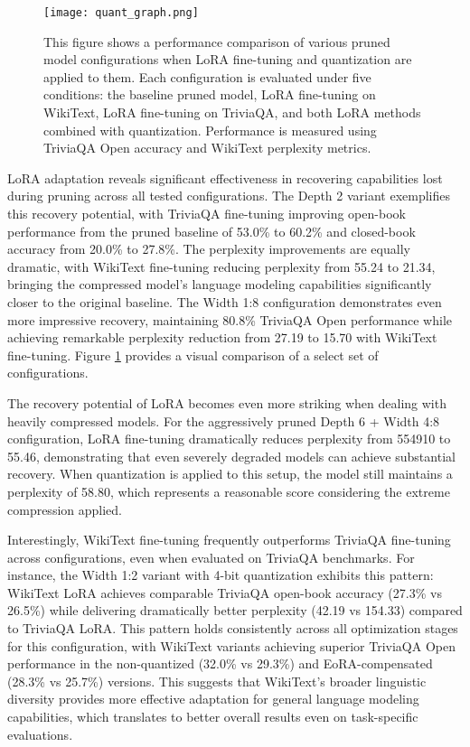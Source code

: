 \begin{figure}[!htbp]
    \centering
    \texttt{[image: quant\_graph.png]}
    \caption[Comparison of Quantized and LoRA Models]{This figure shows a performance comparison of various pruned model configurations when LoRA fine-tuning and quantization are applied to them. Each configuration is evaluated under five conditions: the baseline pruned model, LoRA fine-tuning on WikiText, LoRA fine-tuning on TriviaQA, and both LoRA methods combined with quantization. Performance is measured using TriviaQA Open accuracy and WikiText perplexity metrics.}
    \label{fig:graph_quant}
\end{figure}

LoRA adaptation reveals significant effectiveness in recovering capabilities lost during pruning across all tested configurations. The Depth 2 variant exemplifies this recovery potential, with TriviaQA fine-tuning improving open-book performance from the pruned baseline of 53.0\% to 60.2\% and closed-book accuracy from 20.0\% to 27.8\%. The perplexity improvements are equally dramatic, with WikiText fine-tuning reducing perplexity from 55.24 to 21.34, bringing the compressed model's language modeling capabilities significantly closer to the original baseline. The Width 1:8 configuration demonstrates even more impressive recovery, maintaining 80.8\% TriviaQA Open performance while achieving remarkable perplexity reduction from 27.19 to 15.70 with WikiText fine-tuning. Figure \ref{fig:graph_quant} provides a visual comparison of a select set of configurations.

The recovery potential of LoRA becomes even more striking when dealing with heavily compressed models. For the aggressively pruned Depth 6 + Width 4:8 configuration, LoRA fine-tuning dramatically reduces perplexity from 554910 to 55.46, demonstrating that even severely degraded models can achieve substantial recovery. When quantization is applied to this setup, the model still maintains a perplexity of 58.80, which represents a reasonable score considering the extreme compression applied.

Interestingly, WikiText fine-tuning frequently outperforms TriviaQA fine-tuning across configurations, even when evaluated on TriviaQA benchmarks. For instance, the Width 1:2 variant with 4-bit quantization exhibits this pattern: WikiText LoRA achieves comparable TriviaQA open-book accuracy (27.3\% vs 26.5\%) while delivering dramatically better perplexity (42.19 vs 154.33) compared to TriviaQA LoRA. This pattern holds consistently across all optimization stages for this configuration, with WikiText variants achieving superior TriviaQA Open performance in the non-quantized (32.0\% vs 29.3\%) and EoRA-compensated (28.3\% vs 25.7\%) versions. This suggests that WikiText's broader linguistic diversity provides more effective adaptation for general language modeling capabilities, which translates to better overall results even on task-specific evaluations.


